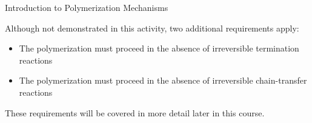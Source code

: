 \begin{activity}{Introduction to Polymerization Mechanisms}
\begin{exercises}
\begin{solution}
{				Although not demonstrated in this activity, two additional requirements apply:
				\begin{itemize}
					\item The polymerization must proceed in the absence of irreversible termination reactions
					\item The polymerization must proceed in the absence of irreversible chain-transfer reactions
				\end{itemize}
				These requirements will be covered in more detail later in this course.
			}\end{solution}
			
\end{exercises}
	
\end{activity}